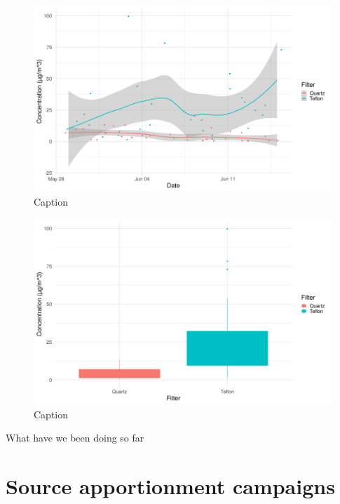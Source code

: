 \documentclass{nwureport}
\begin{document}
\begin{figure}[!htb]
    \centering
    \includegraphics[width=\textwidth]{images/pm10_autumn_jittersmooth.png}
    \caption{Caption}
    \label{fig:pm10_autumn_jitter_smooth}
\end{figure}

\begin{figure}[!htb]
    \centering
    \includegraphics[width=\textwidth]{images/pm10_autumn_box_filter.png}
    \caption{Caption}
    \label{fig:pm10_autumn_box}
\end{figure}

What have we been doing so far


\chapter{Source apportionment campaigns}
\end{document}
